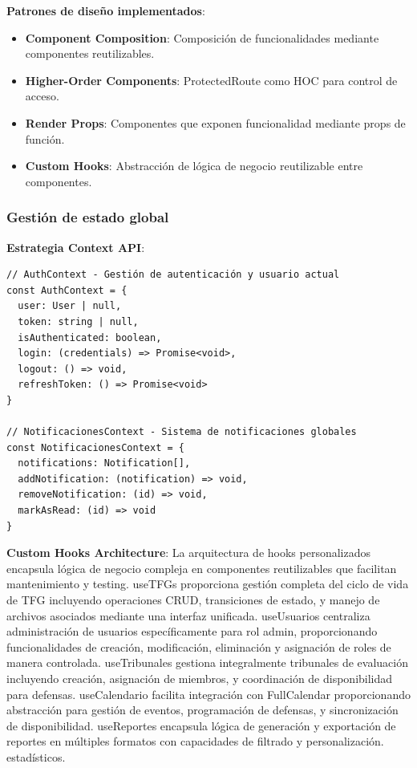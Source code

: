 \documentclass[12pt,a4paper,oneside]{report}
\providecommand{\tightlist}{%
  \setlength{\itemsep}{0pt}\setlength{\parskip}{0pt}}
\begin{document}
\textbf{Patrones de diseño implementados}:

\begin{itemize}
\tightlist
\item
  \textbf{Component Composition}: Composición de funcionalidades
  mediante componentes reutilizables.
\item
  \textbf{Higher-Order Components}: ProtectedRoute como HOC para control
  de acceso.
\item
  \textbf{Render Props}: Componentes que exponen funcionalidad mediante
  props de función.
\item
  \textbf{Custom Hooks}: Abstracción de lógica de negocio reutilizable
  entre componentes.
\end{itemize}

\subsubsection{Gestión de estado
global}\label{gestiuxf3n-de-estado-global}

\textbf{Estrategia Context API}:

\begin{lstlisting}
// AuthContext - Gestión de autenticación y usuario actual
const AuthContext = {
  user: User | null,
  token: string | null,
  isAuthenticated: boolean,
  login: (credentials) => Promise<void>,
  logout: () => void,
  refreshToken: () => Promise<void>
}

// NotificacionesContext - Sistema de notificaciones globales
const NotificacionesContext = {
  notifications: Notification[],
  addNotification: (notification) => void,
  removeNotification: (id) => void,
  markAsRead: (id) => void
}
\end{lstlisting}

\textbf{Custom Hooks Architecture}: La arquitectura de hooks personalizados encapsula lógica de negocio compleja en componentes reutilizables que facilitan mantenimiento y testing. useTFGs proporciona gestión completa del ciclo de vida de TFG incluyendo operaciones CRUD, transiciones de estado, y manejo de archivos asociados mediante una interfaz unificada. useUsuarios centraliza administración de usuarios específicamente para rol admin, proporcionando funcionalidades de creación, modificación, eliminación y asignación de roles de manera controlada. useTribunales gestiona integralmente tribunales de evaluación incluyendo creación, asignación de miembros, y coordinación de disponibilidad para defensas. useCalendario facilita integración con FullCalendar proporcionando abstracción para gestión de eventos, programación de defensas, y sincronización de disponibilidad. useReportes encapsula lógica de generación y exportación de reportes en múltiples formatos con capacidades de filtrado y personalización.
estadísticos.
\end{document}
